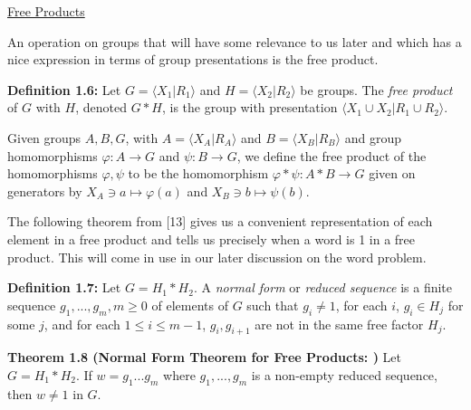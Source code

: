 \documentclass[12pt]{article}
\newcommand{\vs}{\vskip10pt}
\begin{document}
	\vs 
	
	\underline{Free Products}
	
	\vs
	
	An operation on groups that will have some relevance to us later and which has a nice expression in terms of group presentations is the free product. 
	
	\vs 
	
	\textbf{Definition 1.6: } Let $G = \langle X_1 \vert R_1 \rangle$ and $H = \langle X_2 \vert R_2 \rangle$ be groups. The \textit{free product} of $G$ with $H$, denoted $G*H$, is the group with presentation $\langle X_1 \cup X_2 \vert R_1 \cup R_2 \rangle$. 
	
	\vs 
	
	Given groups $A,B,G$, with $A = \langle X_A \vert R_A \rangle$ and $B = \langle X_B \vert R_B \rangle$ and group homomorphisms $\varphi: A \rightarrow G$ and $\psi: B \rightarrow G$, we define the free product of the homomorphisms $\varphi, \psi$ to be the homomorphism $\varphi * \psi: A * B \rightarrow G$ given on generators by $X_A \ni a \mapsto \varphi(a)$ and $X_B \ni b \mapsto \psi(b)$. 
	
	\vs 
	
	The following theorem from [13] gives us a convenient representation of each element in a free product and tells us precisely when a word is 1 in a free product. This will come in use in our later discussion on the word problem. 
	
	\vs 
	
	\textbf{Definition 1.7: } Let $G = H_1 * H_2$. A \textit{normal form} or \textit{reduced sequence} is a finite sequence $g_1,...,g_m, m \geq 0$ of elements of $G$ such that $g_i \neq 1$, for each $i$, $g_i \in H_j$ for some $j$, and for each $1 \leq i \leq m-1$, $g_i, g_{i+1}$ are not in the same free factor $H_j$. 
	
	\vs
	
	\textbf{Theorem 1.8 (Normal Form Theorem for Free Products: )} Let $G = H_1 * H_2$. If $w = g_1...g_m$ where $g_1,...,g_m$ is a non-empty reduced sequence, then $w \neq 1$ in $G$. 
	
\end{document}
